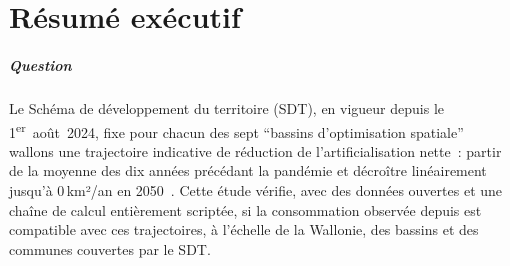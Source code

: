 \documentclass[11pt,a4paper]{report}
\newcommand{\kmdan}{\,km²/an}
\begin{document}
\chapter*{Résumé exécutif}

\paragraph{Question} Le Schéma de développement du territoire (SDT), en vigueur depuis le 1\textsuperscript{er}~août~2024, fixe pour chacun des sept \enquote{bassins d'optimisation spatiale} wallons une trajectoire indicative de réduction de l'artificialisation nette~: partir de la moyenne des dix années précédant la pandémie et décroître linéairement jusqu'à 0\kmdan{} en 2050~\citep{sdt2024}. Cette étude vérifie, avec des données ouvertes et une chaîne de calcul entièrement scriptée, si la consommation observée depuis \AnneeDebutObs{} est compatible avec ces trajectoires, à l'échelle de la Wallonie, des bassins et des \NbCommunesSDT{} communes couvertes par le SDT.
\end{document}
